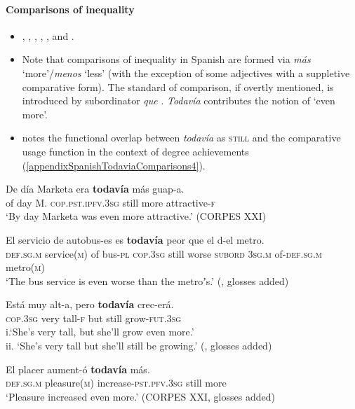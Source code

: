 \paragraph{Comparisons of inequality}
\label{appendixSpanishTodaviaComparisons}
\begin{itemize}
	\sloppy
	\item \textcite{Bosque2016}, \textcite{Cid1999}, \textcite{EderlyCurco2016}, \textcite{Garrido1993}, \textcite{Martinez1996}, \textcite{Morera1999} and \textcite[§30.8q–r]{RAEGramatica}.
	\item Note that comparisons of inequality in Spanish are formed via \textit{más} \lq more'\slash\textit{menos} \lq less' (with the exception of some adjectives with a suppletive comparative form). The standard of comparison, if overtly mentioned, is  introduced by subordinator \textit{que} \parencite[ch. 45]{RAEGramatica}. \textit{Todavía} contributes the notion of \lq even more\rq{}.
	\item \textcite{Bosque2016} notes the functional overlap between \textit{todavía} as \textsc{still} and the comparative usage function in the context of degree achievements (\ref{appendixSpanishTodaviaComparisons4}).
\end{itemize}
\begin{exe}
	\ex \gll De día Marketa era \textbf{todavía} más guap-a.\\
	of day M. \textsc{cop}.\textsc{pst}.\textsc{ipfv}.3\textsc{sg} still more attractive-\textsc{f}\\
	\glt \lq By day Marketa was even more attractive.' (CORPES XXI)
	
	\ex \gll El servicio de autobus-es es \textbf{todavía} peor que el d-el metro.\\
	\textsc{def}.\textsc{sg}.\textsc{m} service(\textsc{m}) of bus-\textsc{pl} \textsc{cop}.3\textsc{sg} still worse \textsc{subord} 3\textsc{sg}.\textsc{m} of-\textsc{def}.\textsc{sg}.\textsc{m} metro(\textsc{m})\\
	\glt \lq The bus service is even worse than the metroʼs.\rq{ }(\cite[36]{EderlyCurco2016}, glosses added)
	
	\ex\label{appendixSpanishTodaviaComparisons3}
	\gll Está muy alt-a, pero \textbf{todavía} crec-erá.\\
	\textsc{cop}.3\textsc{sg} very tall-\textsc{f} but still grow-\textsc{fut}.3\textsc{sg}\\
	\glt i.\phantom{i}\lq She's very tall, but she'll grow even more.\rq
	\\ii. \lq{}She's very tall but she'll still be growing.\rq{ }(\cite[214]{Bosque2016}, glosses added)
	
		\ex\label{appendixSpanishTodaviaComparisons4}
		\gll El placer aument-ó \textbf{todavía} más.\\
		\textsc{def}.\textsc{sg}.\textsc{m} pleasure(\textsc{m}) increase-\textsc{pst}.\textsc{pfv}.3\textsc{sg} still more\\
		\glt \lq Pleasure increased even more.' (CORPES XXI, glosses added)
\end{exe}

